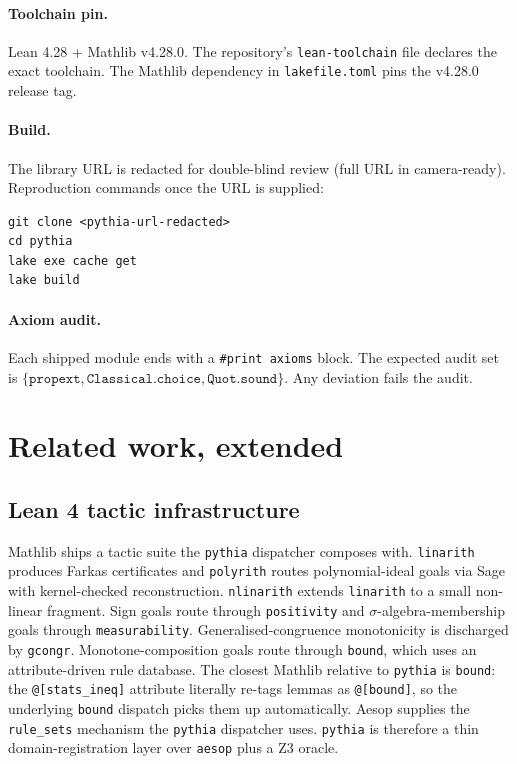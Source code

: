 \paragraph{Toolchain pin.}
Lean 4.28 + Mathlib v4.28.0. The repository's
\texttt{lean-toolchain} file declares the exact toolchain. The
Mathlib dependency in \texttt{lakefile.toml} pins the v4.28.0 release
tag.

\paragraph{Build.}
The library URL is redacted for double-blind review (full URL in
camera-ready). Reproduction commands once the URL is supplied:
\begin{verbatim}
git clone <pythia-url-redacted>
cd pythia
lake exe cache get
lake build
\end{verbatim}

\paragraph{Axiom audit.}
Each shipped module ends with a \texttt{\#print axioms} block. The
expected audit set is
$\{\texttt{propext}, \texttt{Classical.choice}, \texttt{Quot.sound}\}$.
Any deviation fails the audit.

\section{Related work, extended}
\label{sec:appendix-related}

\subsection{Lean 4 tactic infrastructure}
Mathlib ships a tactic suite the \texttt{pythia} dispatcher composes
with. \texttt{linarith} produces Farkas certificates and
\texttt{polyrith} routes polynomial-ideal goals via Sage with
kernel-checked reconstruction. \texttt{nlinarith} extends
\texttt{linarith} to a small non-linear fragment. Sign goals route
through \texttt{positivity} and $\sigma$-algebra-membership goals
through \texttt{measurability}. Generalised-congruence monotonicity
is discharged by \texttt{gcongr}. Monotone-composition goals route
through \texttt{bound}, which uses an attribute-driven rule
database.
The closest Mathlib relative to \texttt{pythia} is \texttt{bound}:
the \texttt{@[stats\_ineq]} attribute literally re-tags lemmas as
\texttt{@[bound]}, so the underlying \texttt{bound} dispatch picks
them up automatically. Aesop \citep{aesop2023} supplies the
\texttt{rule\_sets} mechanism the \texttt{pythia} dispatcher uses.
\texttt{pythia} is therefore a thin domain-registration layer over
\texttt{aesop} plus a Z3 oracle.


